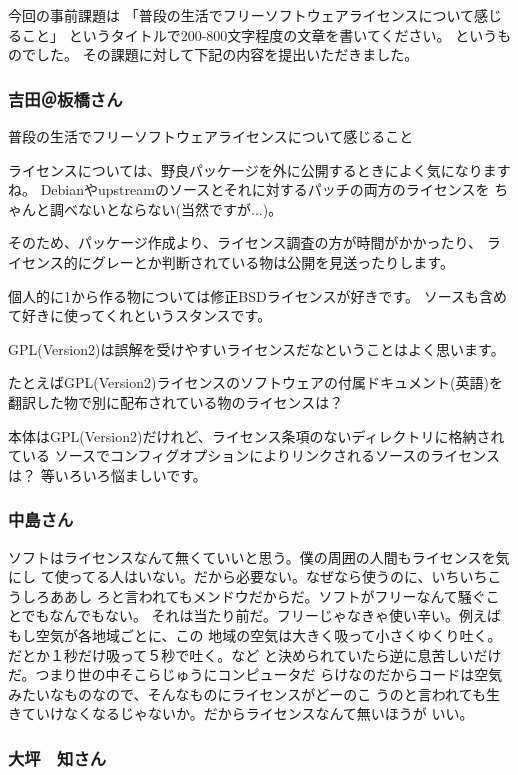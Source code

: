 \documentclass[mingoth,a4paper]{jsarticle}
\begin{document}
今回の事前課題は
「普段の生活でフリーソフトウェアライセンスについて感じること」
というタイトルで200-800文字程度の文章を書いてください。
というものでした。
その課題に対して下記の内容を提出いただきました。

\subsubsection{吉田＠板橋さん}

普段の生活でフリーソフトウェアライセンスについて感じること

ライセンスについては、野良パッケージを外に公開するときによく気になりますね。
Debianやupstreamのソースとそれに対するパッチの両方のライセンスを
ちゃんと調べないとならない(当然ですが...)。

そのため、パッケージ作成より、ライセンス調査の方が時間がかかったり、
ライセンス的にグレーとか判断されている物は公開を見送ったりします。

個人的に1から作る物については修正BSDライセンスが好きです。
ソースも含めて好きに使ってくれというスタンスです。

GPL(Version2)は誤解を受けやすいライセンスだなということはよく思います。

たとえばGPL(Version2)ライセンスのソフトウェアの付属ドキュメント(英語)を
翻訳した物で別に配布されている物のライセンスは？

本体はGPL(Version2)だけれど、ライセンス条項のないディレクトリに格納されている
ソースでコンフィグオプションによりリンクされるソースのライセンスは？
等いろいろ悩ましいです。

\subsubsection{中島さん}

 ソフトはライセンスなんて無くていいと思う。僕の周囲の人間もライセンスを気にし
て使ってる人はいない。だから必要ない。なぜなら使うのに、いちいちこうしろああし
ろと言われてもメンドウだからだ。ソフトがフリーなんて騒ぐことでもなんでもない。
それは当たり前だ。フリーじゃなきゃ使い辛い。例えばもし空気が各地域ごとに、この
地域の空気は大きく吸って小さくゆくり吐く。だとか１秒だけ吸って５秒で吐く。など
と決められていたら逆に息苦しいだけだ。つまり世の中そこらじゅうにコンピュータだ
らけなのだからコードは空気みたいなものなので、そんなものにライセンスがどーのこ
うのと言われても生きていけなくなるじゃないか。だからライセンスなんて無いほうが
いい。

\subsubsection{大坪　知さん}
\end{document}
